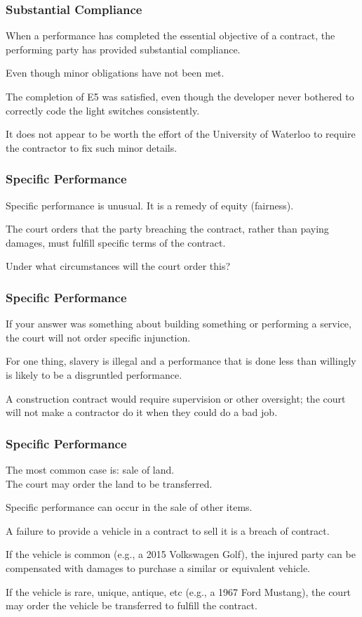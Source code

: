 \begin{frame}
\frametitle{Substantial Compliance}

When a performance has completed the essential objective of a contract, the performing party has provided \alert{substantial compliance}.

Even though minor obligations have not been met.

The completion of E5 was satisfied, even though the developer never bothered to correctly code the light switches consistently.

It does not appear to be worth the effort of the University of Waterloo to require the contractor to fix such minor details.

\end{frame}



\begin{frame}
\frametitle{Specific Performance}

Specific performance is unusual. It is a remedy of equity (fairness).

The court orders that the party breaching the contract, rather than paying damages, must fulfill specific terms of the contract.

Under what circumstances will the court order this?

\end{frame}




\begin{frame}
\frametitle{Specific Performance}

If your answer was something about building something or performing a service, the court will not order specific injunction.

For one thing, slavery is illegal and a performance that is done less than willingly is likely to be a disgruntled performance.

A construction contract would require supervision or other oversight; the court will not make a contractor do it when they could do a bad job.

\end{frame}



\begin{frame}
\frametitle{Specific Performance}

The most common case is: sale of land.\\
\quad The court may order the land to be transferred.

Specific performance can occur in the sale of other items.

A failure to provide a vehicle in a contract to sell it is a breach of contract.

If the vehicle is common (e.g., a 2015 Volkswagen Golf), the injured party can be compensated with damages to purchase a similar or equivalent vehicle.

If the vehicle is rare, unique, antique, etc (e.g., a 1967 Ford Mustang), the court may order the vehicle be transferred to fulfill the contract.

\end{frame}



